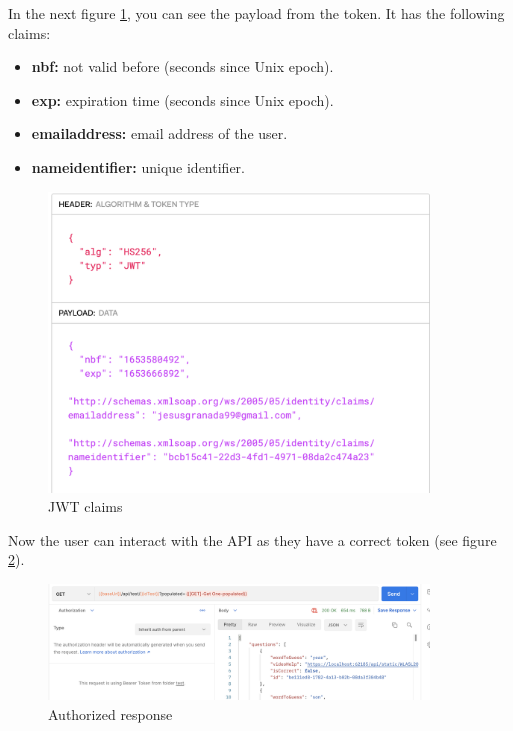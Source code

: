             In the next figure \ref{fig:user_jwtclaims}, you can see the payload from the token. It has the following claims:
            \begin{itemize}[noitemsep]
                \item \textbf{nbf:} not valid before (seconds since Unix epoch).
                \item \textbf{exp:} expiration time (seconds since Unix epoch).
                \item \textbf{emailaddress:} email address of the user.
                \item \textbf{nameidentifier:} unique identifier.
            \end{itemize}
            \begin{figure}[H]
                \centering
                    \includegraphics[width=0.9\textwidth]{assets/jwt.io.png}
                \caption{JWT claims}
                \label{fig:user_jwtclaims}
            \end{figure}

            Now the user can interact with the API as they have a correct token (see figure \ref{fig:user_authorized}).
            \begin{figure}[H]
                \centering
                    \includegraphics[width=0.9\textwidth]{assets/authorized.png}
                \caption{Authorized response}
                \label{fig:user_authorized}
            \end{figure}

